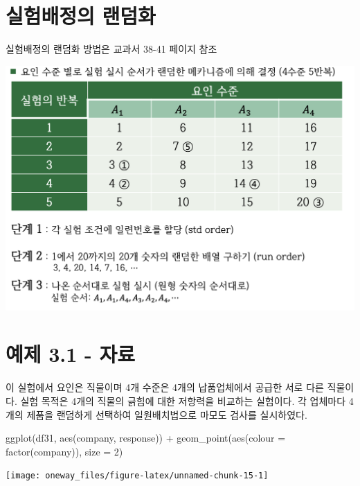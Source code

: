 \documentclass[
]{book}
\newenvironment{Shaded}{\begin{snugshade}}{\end{snugshade}}
\newcommand{\AttributeTok}[1]{\textcolor[rgb]{0.77,0.63,0.00}{#1}}
\newcommand{\DecValTok}[1]{\textcolor[rgb]{0.00,0.00,0.81}{#1}}
\newcommand{\FunctionTok}[1]{\textcolor[rgb]{0.00,0.00,0.00}{#1}}
\newcommand{\NormalTok}[1]{#1}
\newcommand{\SpecialCharTok}[1]{\textcolor[rgb]{0.00,0.00,0.00}{#1}}
\begin{document}
\hypertarget{uxc2e4uxd5d8uxbc30uxc815uxc758-uxb79cuxb364uxd654}{%
\section{실험배정의 랜덤화}\label{uxc2e4uxd5d8uxbc30uxc815uxc758-uxb79cuxb364uxd654}}

실험배정의 랜덤화 방법은 교과서 38-41 페이지 참조

\includegraphics{oneway-random.png}

\hypertarget{uxc608uxc81c-3.1---uxc790uxb8cc}{%
\section{예제 3.1 - 자료}\label{uxc608uxc81c-3.1---uxc790uxb8cc}}

이 실험에서 요인은 직물이며 4개 수준은 4개의 납품업체에서 공급한 서로 다른 직물이다. 실험 목적은 4개의 직물의 긁힘에 대한 저항력을 비교하는 실험이다. 각 업체마다 4개의 제품을 랜덤하게 선택하여 일원배치법으로 마모도 검사를 실시하였다.

\begin{Shaded}
\begin{Highlighting}[]
\FunctionTok{ggplot}\NormalTok{(df31, }\FunctionTok{aes}\NormalTok{(company, response)) }\SpecialCharTok{+}   \FunctionTok{geom\_point}\NormalTok{(}\FunctionTok{aes}\NormalTok{(}\AttributeTok{colour =} \FunctionTok{factor}\NormalTok{(company)), }\AttributeTok{size =} \DecValTok{2}\NormalTok{)}
\end{Highlighting}
\end{Shaded}

\begin{center}\texttt{[image: oneway\_files/figure-latex/unnamed-chunk-15-1]} \end{center}
\end{document}
